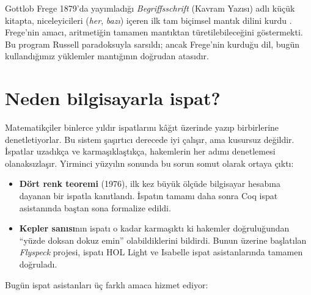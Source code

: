 \begin{tarihce}
Gottlob Frege 1879'da yayımladığı \emph{Begriffsschrift} (Kavram Yazısı)
adlı küçük kitapta, niceleyicileri (\emph{her}, \emph{bazı}) içeren ilk
tam biçimsel mantık dilini kurdu \citep{frege1879}. Frege'nin amacı,
aritmetiğin tamamen mantıktan türetilebileceğini göstermekti. Bu program
Russell paradoksuyla sarsıldı; ancak Frege'nin kurduğu dil, bugün
kullandığımız yüklemler mantığının doğrudan atasıdır.
\end{tarihce}

\section{Neden bilgisayarla ispat?}\label{sec:neden}

Matematikçiler binlerce yıldır ispatlarını kâğıt üzerinde yazıp birbirlerine
denetletiyorlar. Bu sistem şaşırtıcı derecede iyi çalışır, ama kusursuz
değildir. İspatlar uzadıkça ve karmaşıklaştıkça, hakemlerin her adımı
denetlemesi olanaksızlaşır. Yirminci yüzyılın sonunda bu sorun somut olarak
ortaya çıktı:

\begin{itemize}
  \item \textbf{Dört renk teoremi} (1976), ilk kez büyük ölçüde bilgisayar
  hesabına dayanan bir ispatla kanıtlandı. İspatın tamamı daha sonra Coq
  ispat asistanında baştan sona formalize edildi.
  \item \textbf{Kepler sanısı}nın ispatı o kadar karmaşıktı ki hakemler
  doğruluğundan ``yüzde doksan dokuz emin'' olabildiklerini bildirdi. Bunun
  üzerine başlatılan \emph{Flyspeck} projesi, ispatı HOL Light ve Isabelle
  ispat asistanlarında tamamen doğruladı.
\end{itemize}

Bugün ispat asistanları üç farklı amaca hizmet ediyor:

\begin{center}
\end{center}

